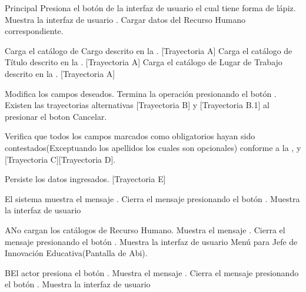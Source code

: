 \begin{UCtrayectoria}{Principal}
    \UCpaso[\UCactor] Presiona el botón  de la interfaz de usuario  el cual tiene forma de lápiz.
    \UCpaso Muestra la interfaz de usuario .
    \UCpaso Cargar datos del Recurso Humano correspondiente.
    
    \UCpaso Carga el catálogo de Cargo descrito en la . [Trayectoria A]
    \UCpaso Carga el catálogo de Título descrito en la . [Trayectoria A]
    \UCpaso Carga el catálogo de Lugar de Trabajo descrito en la . [Trayectoria A]

    \UCpaso[\UCactor] Modifica los campos deseados.
    \UCpaso[\UCactor] Termina la operación presionando el botón .  Existen las trayectorias alternativas [Trayectoria B] y [Trayectoria B.1] al presionar el boton Cancelar.

    \UCpaso Verifica que todos los campos marcados como obligatorios hayan sido contestados(Exceptuando los apellidos los cuales son opcionales) conforme a la , y [Trayectoria C][Trayectoria D].

    \UCpaso Persiste los datos ingresados. [Trayectoria E]

    \UCpaso El sistema muestra el mensaje .
    \UCpaso[\UCactor] Cierra el mensaje presionando el botón .
    \UCpaso Muestra la interfaz de usuario 
\end{UCtrayectoria}
\begin{UCtrayectoriaA}{A}{No cargan los catálogos de Recurso Humano.}
    \UCpaso Muestra el mensaje .
    \UCpaso[\UCactor] Cierra el mensaje presionando el botón .
\UCpaso Muestra la interfaz de usuario Menú para Jefe de Innovación Educativa(Pantalla de Abi).
\end{UCtrayectoriaA}
\begin{UCtrayectoriaA}{B}{El actor presiona el botón .}
    \UCpaso Muestra el mensaje .
    \UCpaso[\UCactor] Cierra el mensaje presionando el botón .
    \UCpaso Muestra la interfaz de usuario 
\end{UCtrayectoriaA}
